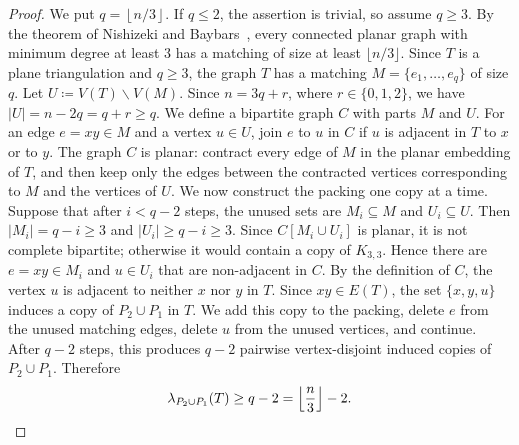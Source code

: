 \documentclass{patmorin}
\newcommand{\sm}{\smallsetminus}
\begin{document}
\begin{proof}
We put $q=\left\lfloor n/3\right\rfloor$.
If $q\le 2$, the assertion is trivial, so assume $q\ge 3$.
By the theorem of Nishizeki and Baybars~\cite{NishizekiBaybars1979}, every
connected planar graph with minimum degree at least $3$ has a matching of size
at least $\lfloor n/3\rfloor$. Since $T$ is a plane triangulation and
$q\ge 3$, the graph $T$ has a matching $M=\{e_1,\dots,e_q\}$
of size $q$.
Let $U\coloneqq V(T)\sm V(M)$. Since $n=3q+r$, where $r\in\{0,1,2\}$, we have $|U|=n-2q=q+r\ge q$.
We define a bipartite graph $C$ with parts $M$ and $U$. For an edge
$e=xy\in M$ and a vertex $u\in U$, join $e$ to $u$ in $C$ if $u$ is adjacent
in $T$ to $x$ or to $y$. The graph $C$ is planar: contract every edge of $M$ in the planar embedding of $T$, and then keep only the edges between the contracted vertices corresponding to $M$ and the vertices of $U$.
We now construct the packing one copy at a time. Suppose that after
$i<q-2$ steps, the unused sets are $M_i\subseteq M$ and $U_i\subseteq U$.
Then $|M_i|=q-i\ge 3$ and $|U_i|\ge q-i\ge 3$.
Since $C[M_i\cup U_i]$ is planar, it is not complete bipartite; otherwise it
would contain a copy of $K_{3,3}$. Hence there are $e=xy\in M_i$ and
$u\in U_i$ that are non-adjacent in $C$.
By the definition of $C$, the vertex $u$ is adjacent to neither $x$ nor $y$ in $T$. 
Since $xy\in E(T)$, the set $\{x,y,u\}$ induces a copy of
$P_2\cup P_1$ in $T$. 
We add this copy to the packing, delete $e$ from the
unused matching edges, delete $u$ from the unused vertices, and continue.
After $q-2$ steps, this produces $q-2$ pairwise vertex-disjoint induced copies of $P_2\cup P_1$. Therefore
\[
\lambda_{P_2\cup P_1}(T)\ge q-2
=
\left\lfloor \frac n3\right\rfloor-2.\qedhere
\]
\end{proof}
\end{document}
